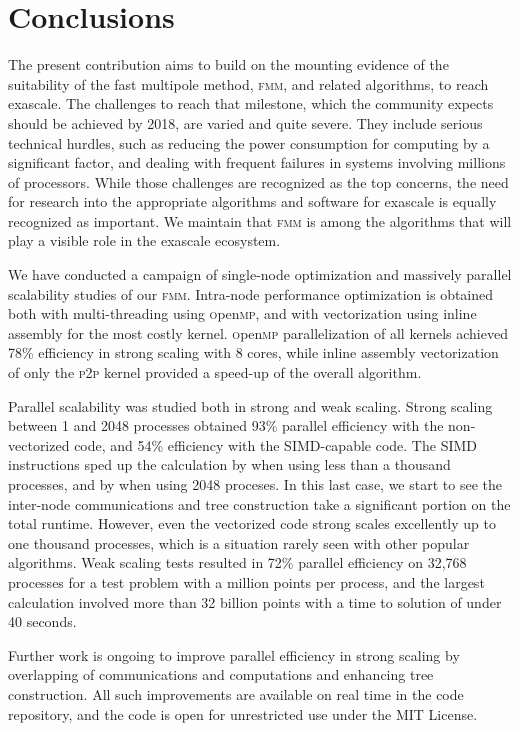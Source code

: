 \documentclass[10pt,twocolumn]{article}
\newcommand{\fmm}{\textsc{fmm}\xspace}
\newcommand{\openmp}{\textsc{o}pen\textsc{mp}\xspace}
\newcommand{\PP}{\textsc{p}2\textsc{p}\xspace}
\newlength{\up}
\begin{document}
\section{Conclusions}

The present contribution aims to build on the mounting evidence of the suitability of the fast multipole method, \fmm, and related algorithms, to reach exascale. The challenges to reach that milestone, which the community expects should be achieved by 2018, are varied and quite severe. They include serious technical hurdles, such as reducing the power consumption for computing by a significant factor, and dealing with frequent failures in systems involving millions of processors. While those challenges are recognized as the top concerns, the need for research into the appropriate algorithms and software for exascale is equally recognized as important. We maintain that \fmm is among the algorithms that will play a visible role in the exascale ecosystem.


We have conducted a campaign of single-node optimization and massively parallel scalability studies of our \fmm. Intra-node performance optimization is obtained both with multi-threading using \openmp, and with vectorization using inline assembly for the most costly kernel. \openmp parallelization of all kernels achieved 78\% efficiency in strong scaling with 8 cores, while inline assembly vectorization of only the \PP kernel provided a  speed-up of the overall algorithm. 

Parallel scalability was studied  both in strong and weak scaling. Strong scaling between 1 and 2048 processes obtained 93\% parallel efficiency with the non-vectorized code, and 54\% efficiency with the SIMD-capable code. The SIMD instructions sped up the calculation by  when using less than a thousand processes, and by  when using 2048 proceses. In this last case, we start to see the inter-node communications and tree construction take a significant portion on the total runtime. However, even the vectorized code strong scales excellently up to one thousand processes, which is a situation rarely seen with other popular algorithms.
Weak scaling tests resulted in 72\% parallel efficiency on 32,768 processes for a test problem with a million points per process, and the largest calculation involved more than 32 billion points with a time to solution of under 40 seconds. 

Further work is ongoing to improve parallel efficiency in strong scaling by overlapping of communications and computations and enhancing tree construction. All such improvements are available on real time in the code repository, and the code is open for unrestricted use under the MIT License.
\end{document}
